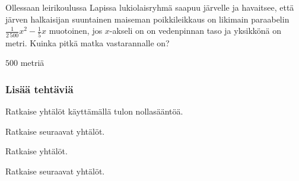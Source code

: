 \begin{tehtavasivu}
\begin{tehtava}
Ollessaan leirikoulussa Lapissa lukiolaisryhmä saapuu järvelle ja havaitsee, että järven halkaisijan suuntainen maiseman poikkileikkaus on likimain paraabelin $\frac{1}{2\,500}x^2-\frac{1}{5}x$ muotoinen, jos $x$-akseli on on vedenpinnan taso ja yksikkönä on metri. Kuinka pitkä matka vastarannalle on?
\begin{vastaus}
$500$ metriä
\end{vastaus}
\end{tehtava}

\subsubsection*{Lisää tehtäviä}

\begin{tehtava}
    Ratkaise yhtälöt käyttämällä tulon nollasääntöä.
    \begin{vastaus}
    \end{vastaus}
\end{tehtava}

\begin{tehtava}
    Ratkaise seuraavat yhtälöt.
    \begin{vastaus}
    \end{vastaus}
\end{tehtava}

\begin{tehtava}
    Ratkaise yhtälöt.
    \begin{vastaus}
    \end{vastaus}
\end{tehtava}

\begin{tehtava}
    Ratkaise seuraavat yhtälöt.
    \begin{vastaus}
    \end{vastaus}
\end{tehtava}


\end{tehtavasivu}
